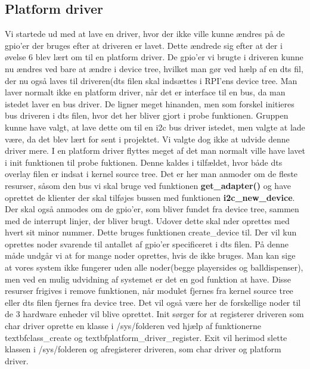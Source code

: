 \documentclass[Softwaredesign/Softwaredesign_main.tex]{subfiles}
\begin{document}
\subsection{Platform driver}
Vi startede ud med at lave en driver, hvor der ikke ville kunne ændres på de gpio'er der bruges efter at driveren er lavet. Dette ændrede sig efter at der i øvelse 6 blev lært om til en platform driver. De gpio'er vi brugte i driveren kunne nu ændres ved bare at ændre i device tree, hvilket man gør ved hælp af en dts fil, der nu også laves til driveren(dts filen skal indsættes i RPI'ens device tree. Man laver normalt ikke en platform driver, når det er interface til en bus, da man istedet laver en bus driver. De ligner meget hinanden,  men som forskel initieres bus driveren i dts filen, hvor det her bliver gjort i probe funktionen. Gruppen kunne have valgt, at lave dette om til en i2c bus driver istedet, men valgte at lade være, da det blev lært for sent i projektet. Vi valgte dog ikke at udvide denne driver mere. I en platform driver flyttes meget af det man normalt ville have lavet i init funktionen til probe fuktionen. Denne kaldes i tilfældet, hvor både dts overlay filen er indsat i kernel source tree. Det er her man anmoder om de fleste resurser, såsom den bus vi skal bruge ved funktionen \textbf{get\_adapter()} og have oprettet de klienter der skal tilføjes bussen med funktionen \textbf{i2c\_new\_device}. Der skal også anmodes om de gpio'er, som bliver fundet fra device tree, sammen med de interrupt linjer, der bliver brugt. Udover dette skal nder oprettes med hvert sit minor nummer. Dette bruges funktionen create\_device til. Der vil kun oprettes noder svarende til antallet af gpio'er specificeret i dts filen. På denne måde undgår vi at for mange noder oprettes, hvis de ikke bruges. Man kan sige at vores system ikke fungerer uden alle  noder(begge playersides og balldispenser), men ved en mulig udvidning af systemet er det en god funktion at have. Disse resurser frigives i remove funktionen, når modulet fjernes fra kernel source tree eller dts filen fjernes fra device tree. Det vil også være her de forskellige noder til de 3 hardware enheder vil blive oprettet.
Init sørger for at registerer driveren som char driver oprette en klasse i /sys/folderen ved hjælp af funktionerne textbf{class\_create} og textbf{platform\_driver\_register}. Exit vil herimod slette klassen i /sys/folderen og afregisterer driveren, som char driver og platform driver.
\end{document}
